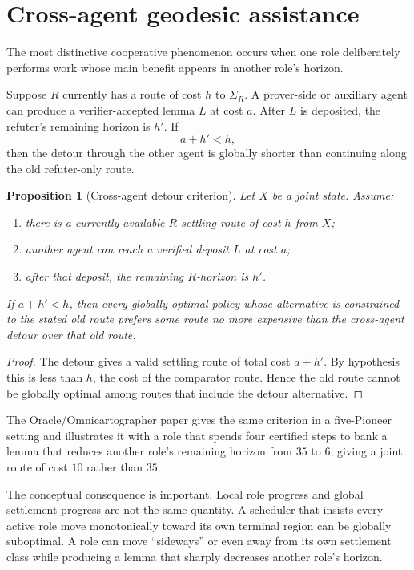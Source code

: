 \documentclass[11pt]{article}
\newtheorem{proposition}[definition]{Proposition}
\theoremstyle{remark}
\begin{document}
\section{Cross-agent geodesic assistance}

The most distinctive cooperative phenomenon occurs when one role deliberately performs work whose main benefit appears in another role's horizon.

Suppose $R$ currently has a route of cost $h$ to $\Sigma_R$. A prover-side or auxiliary agent can produce a verifier-accepted lemma $L$ at cost $a$. After $L$ is deposited, the refuter's remaining horizon is $h'$. If
\[
\boxed{a+h'<h,}
\]
then the detour through the other agent is globally shorter than continuing along the old refuter-only route.

\begin{proposition}[Cross-agent detour criterion]
Let $X$ be a joint state. Assume:
\begin{enumerate}[label=(\roman*)]
\item there is a currently available $R$-settling route of cost $h$ from $X$;
\item another agent can reach a verified deposit $L$ at cost $a$;
\item after that deposit, the remaining $R$-horizon is $h'$.
\end{enumerate}
If $a+h'<h$, then every globally optimal policy whose alternative is constrained to the stated old route prefers some route no more expensive than the cross-agent detour over that old route.
\end{proposition}

\begin{proof}
The detour gives a valid settling route of total cost $a+h'$. By hypothesis this is less than $h$, the cost of the comparator route. Hence the old route cannot be globally optimal among routes that include the detour alternative.
\end{proof}

The Oracle/Omnicartographer paper gives the same criterion in a five-Pioneer setting and illustrates it with a role that spends four certified steps to bank a lemma that reduces another role's remaining horizon from $35$ to $6$, giving a joint route of cost $10$ rather than $35$ \cite{TennesonOracle}.

The conceptual consequence is important. Local role progress and global settlement progress are not the same quantity. A scheduler that insists every active role move monotonically toward its own terminal region can be globally suboptimal. A role can move ``sideways'' or even away from its own settlement class while producing a lemma that sharply decreases another role's horizon.
\end{document}
